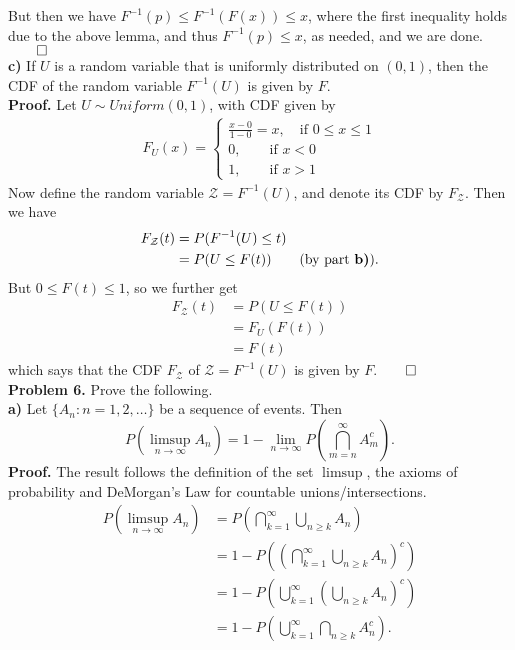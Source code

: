 \documentclass[11pt, letterpaper]{article}
\newcommand{\mc}[1]{\mathcal{#1}}
\begin{document}
    But then we have $F^{-1}(p)\leq F^{-1}(F(x))\leq x$, where the first inequality holds due to the above lemma, and thus $F^{-1}(p)\leq x$, as needed, and we are done.\hfill{$\qed$}\\[10pt]
    {\bf c)} If $U$ is a random variable that is uniformly distributed on $(0,1)$, then the CDF of the random variable $F^{-1}(U)$ is given by $F$.\\[10pt]
    {\bf Proof.} Let $U\sim Uniform(0,1)$, with CDF given by
    \begin{align*}
        F_U(x)=\begin{cases}
            \frac{x-0}{1-0}=x,\quad\text{if $0\leq x\leq1$}\\
            0,\qquad\text{if $x<0$}\\
            1,\qquad\text{if $x>1$}
        \end{cases}\tag{5.1}
    \end{align*}
    Now define the random variable $\mc{Z}=F^{-1}(U)$, and denote its CDF by $F_\mc{Z}$. Then we have
    \begin{align*}
        F_\mc{Z}(t)&=P(F^{-1}(U)\leq t)\\
        &=P(U\leq F(t))\tag{by part {\bf b)}}.
    \end{align*}
    But $0\leq F(t)\leq 1$, so we further get
    \begin{align*}
        F_\mc{Z}(t)&=P(U\leq F(t))\\
        &=F_U(F(t))\\
        &=F(t)\tag{by 5.1}
    \end{align*}
    which says that the CDF $F_\mc{Z}$ of $\mc{Z}=F^{-1}(U)$ is given by $F$.\hfill{$\qed$}\\[10pt]
    {\bf Problem 6.} Prove the following.\\[10pt]
    {\bf a)} Let $\{A_n:n=1,2,\dots\}$ be a sequence of events. Then
    \[P\left(\limsup_{n\rightarrow\infty}A_n\right)=1-\lim_{n\rightarrow\infty}P\left(\bigcap_{m=n}^\infty A_m^c\right).\]
    {\bf Proof.} The result follows the definition of the set $\limsup$, the axioms of probability and DeMorgan's Law for countable unions/intersections.
    \begin{align*}
        P\left(\limsup_{n\rightarrow\infty}A_n\right)&=P\left(\bigcap_{k=1}^\infty\bigcup_{n\geq k}A_n\right)\\
        &=1-P\left(\left(\bigcap_{k=1}^\infty\bigcup_{n\geq k}A_n\right)^c\right)\tag{axiom of probability}\\
        &=1-P\left(\bigcup_{k=1}^\infty\left(\bigcup_{n\geq k}A_n\right)^c\right)\tag{DeMorgan's law for countable intersection}\\
        &=1-P\left(\bigcup_{k=1}^\infty\bigcap_{n\geq k}A_n^c\right).\tag{DeMorgan's law for countable union}
    \end{align*}
\end{document}
